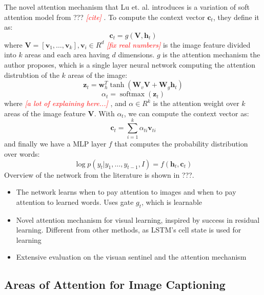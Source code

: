 \documentclass[10pt,twocolumn,letterpaper]{article}
\newcommand{\todo}[1]{\textcolor{red}{{\em [#1]}} }
\newcommand{\matr}[1]{\mathbf{#1}}
\begin{document}
The novel attention mechanism that Lu et. al. introduces is a variation of
soft attention model from ??? \todo{cite}. To compute the context vector
$\boldsymbol{c}_t$, they define it as:
%
\begin{equation}
  \boldsymbol{c}_t = g(\matr{V}, \boldsymbol{h}_t)
\end{equation}
%
where $\matr{V} = [\mathbf{v}_1,\dots,\mathbf{v}_k], \mathbf{v}_i \in R^d$
\todo{fix real numbers} is the image feature divided into $k$ areas and each
area having $d$ dimensions. $g$ is the attention mechanism the author
proposes, which is a single layer neural network computing the attention
distrubtion of the $k$ areas of the image:
%
\begin{equation}
  \matr{z}_t = \matr{w}_h^T \tanh(\matr{W}_v \matr{V} + \matr{W}_g \matr{h}_t)
\end{equation}
%
\begin{equation}
  \alpha_t = \operatorname{softmax}(\matr{z}_t)
\end{equation}
%
where \todo{a lot of explaining here...}, and $\alpha \in R^k$ is the
attention weight over $k$ areas of the image feature $\matr{V}$. With
$\alpha_t$, we can compute the context vector as:
%
\begin{equation}
  \boldsymbol{c}_t = \sum_{i=1}^k \alpha_{ti} \boldsymbol{v}_{ti}
\end{equation}
%
and finally we have a MLP layer $f$ that computes the probability distribution
over words:
%
\begin{equation}
  \log p(y_t | y_1,\dots,y_{t-1},I) = f(\boldsymbol{h}_t, \boldsymbol{c}_t)
\end{equation}
%
Overview of the network from the literature is shown in ???.
\begin{itemize}
  \item The network learns when to pay attention to images and when to pay
        attention to learned words. Uses gate $g_t$, which is learnable
  \item Novel attention mechanism for visual learning, inspired by success in
        residual learning. Different from other methods, as LSTM's cell state
        is used for learning
  \item Extensive evaluation on the visuan sentinel and the attention mechanism
\end{itemize}

\subsection{Areas of Attention for Image Captioning}
\end{document}
